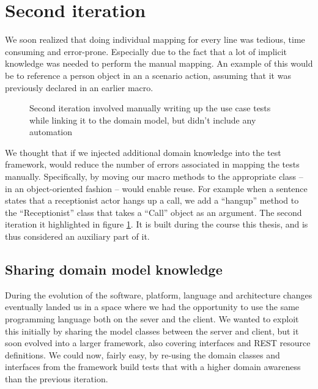 \section{Second iteration}
We soon realized that doing individual mapping for every line was tedious, time consuming and error-prone. Especially due to the fact that a lot of implicit knowledge was needed to perform the manual mapping. An example of this would be to reference a person object in an a scenario action, assuming that it was previously declared in an earlier macro.\medskip
\begin{figure}[!htbp]
\centering
{}
\caption{Second iteration involved manually writing up the use case tests while linking it to the domain model, but didn't include any automation}
\label{fig:project_parameter_plot_2nd_iteration}
\end{figure}
\noindent We thought that if we injected additional domain knowledge into the test framework, would reduce the number of errors associated in mapping the tests manually. Specifically, by moving our macro methods to the appropriate class -- in an object-oriented fashion -- would enable reuse. For example when a sentence states that a receptionist actor hangs up a call, we add a ``hangup'' method to the  ``Receptionist'' class that takes a ``Call'' object as an argument. The second iteration it highlighted in figure \ref{fig:project_parameter_plot_2nd_iteration}. It is built during the course this thesis, and is thus considered an auxiliary part of it.

\subsection{Sharing domain model knowledge}
\label{ssec:openreception-framework}
During the evolution of the software, platform, language and architecture changes eventually landed us in a space where we had the opportunity to use the same programming language both on the sever and the client. We wanted to exploit this initially by sharing the model classes between the server and client, but it soon evolved into a larger framework, also covering interfaces and REST resource definitions. We could now, fairly easy, by re-using the domain classes and interfaces from the framework build tests that with a higher domain awareness than the previous iteration.\medskip

